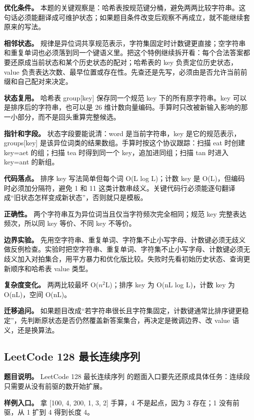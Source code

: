 \textbf{优化条件。} 本题的关键观察是：哈希表按规范键分桶，避免两两比较字符串。这句话必须能翻译成可维护状态；如果题目条件改变后观察不再成立，就不能继续套原来的写法。

\textbf{相邻状态。} 规律是异位词共享规范表示，字符集固定时计数键更直接；空字符串和重复单词也必须落到同一个键语义里。把这个特例继续拆开看：每个合法答案都要还原成当前状态和某个历史状态的配对；哈希表的 key 负责定位历史状态，value 负责表达次数、最早位置或存在性。先查还是先写，必须由是否允许当前前缀和自己配对来决定。

\textbf{状态复用。} 哈希表 group[key] 保存同一个规范 key 下的所有原字符串。key 可以是排序后的字符串，也可以是 26 维计数向量编码。手算时只改被新输入影响的那一小部分，而不是回头重算完整候选。

\textbf{指针和字段。} 状态字段要能说清：word 是当前字符串，key 是它的规范表示，groups[key] 是该异位词类的结果数组。手算时按这个协议跟踪：扫描 eat 时创建 key=aet 的组；扫描 tea 时得到同一个 key，追加进同组；扫描 tan 时进入 key=ant 的新组。

\textbf{代码落点。} 排序 key 写法简单但每个词 O(L log L)；计数 key 是 O(L)，但编码时必须加分隔符，避免 1 和 11 这类计数串歧义。关键代码行必须能逐句翻译成“旧状态怎样变成新状态”，否则就只是模板。

\textbf{正确性。} 两个字符串互为异位词当且仅当字符频次完全相同；规范 key 完整表达频次，所以同 key 等价、不同 key 不等价。

\textbf{边界实验。} 先用空字符串、重复单词、字符集不止小写字母、计数键必须无歧义做反例检查。实验时把空字符串、重复单词、字符集不止小写字母、计数键必须无歧义加入对拍集合，用平方暴力和优化版比较。失败时先看初始历史状态、查询更新顺序和哈希表 value 类型。

\textbf{复杂度变化。} 两两比较最坏 O(\ensuremath{n^{2}}L)；排序 key 为 O(nL log L)，计数 key 为 O(nL)，空间 O(nL)。

\textbf{迁移追问。} 如果题目改成“若字符串很长且字符集固定，计数键通常比排序键更稳定”，先判断原状态是否仍然覆盖新答案集合，再决定是微调边界、改 value 语义，还是换算法。

\subsection{LeetCode 128 最长连续序列}

\textbf{题目说明。} LeetCode 128 最长连续序列 的题面入口要先还原成具体任务：连续段只需要从没有前驱的数开始扩展。

\textbf{样例入口。} 拿 [100, 4, 200, 1, 3, 2] 手算，4 不是起点，因为 3 存在；1 没有前驱，从 1 扩到 4 得到长度 4。

